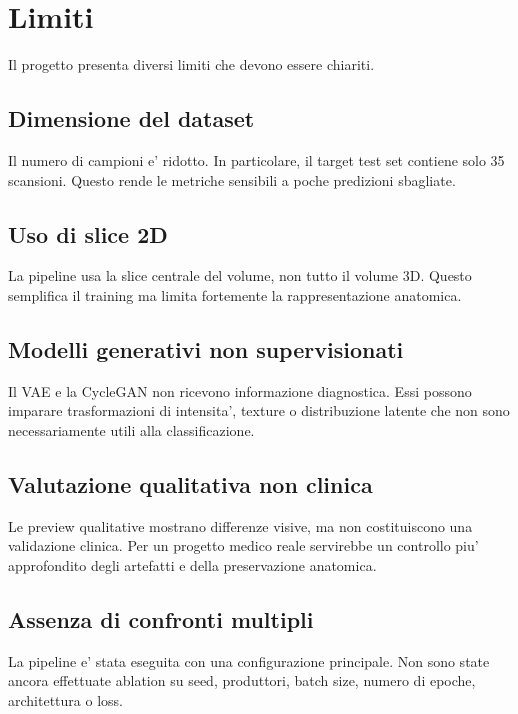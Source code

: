 \documentclass[12pt,a4paper]{article}
\begin{document}
\section{Limiti}

Il progetto presenta diversi limiti che devono essere chiariti.

\subsection{Dimensione del dataset}

Il numero di campioni e' ridotto. In particolare, il target test set contiene solo 35 scansioni. Questo rende le metriche sensibili a poche predizioni sbagliate.

\subsection{Uso di slice 2D}

La pipeline usa la slice centrale del volume, non tutto il volume 3D. Questo semplifica il training ma limita fortemente la rappresentazione anatomica.

\subsection{Modelli generativi non supervisionati}

Il VAE e la CycleGAN non ricevono informazione diagnostica. Essi possono imparare trasformazioni di intensita', texture o distribuzione latente che non sono necessariamente utili alla classificazione.

\subsection{Valutazione qualitativa non clinica}

Le preview qualitative mostrano differenze visive, ma non costituiscono una validazione clinica. Per un progetto medico reale servirebbe un controllo piu' approfondito degli artefatti e della preservazione anatomica.

\subsection{Assenza di confronti multipli}

La pipeline e' stata eseguita con una configurazione principale. Non sono state ancora effettuate ablation su seed, produttori, batch size, numero di epoche, architettura o loss.
\end{document}
